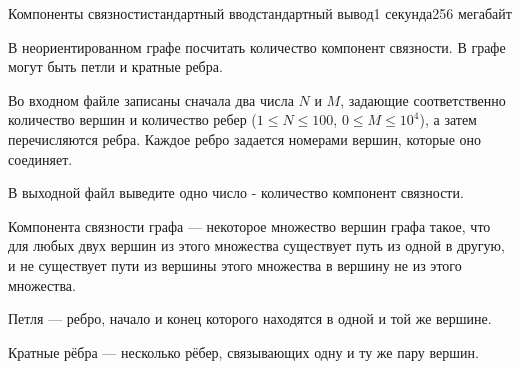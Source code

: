 \begin{problem}{Компоненты связности}{стандартный ввод}{стандартный вывод}{1 секунда}{256 мегабайт}

В неориентированном графе посчитать количество компонент связности. В графе могут быть петли и кратные ребра. 

\InputFile
Во входном файле записаны сначала два числа $N$ и $M$, задающие соответственно количество вершин и количество ребер ($1 \le N \le 100$, $0 \le M \le 10^4$), а затем перечисляются ребра. Каждое ребро задается номерами вершин, которые оно соединяет. 

\OutputFile
В выходной файл выведите одно число - количество компонент связности. 

\Examples

\begin{example}
%
%
%
\end{example}

\Note
Компонента связности графа --- некоторое множество вершин графа такое, что для любых двух вершин из этого множества существует путь из одной в другую, и не существует пути из вершины этого множества в вершину не из этого множества. 

Петля --- ребро, начало и конец которого находятся в одной и той же вершине.

Кратные рёбра --- несколько рёбер, связывающих одну и ту же пару вершин. 

\end{problem}

